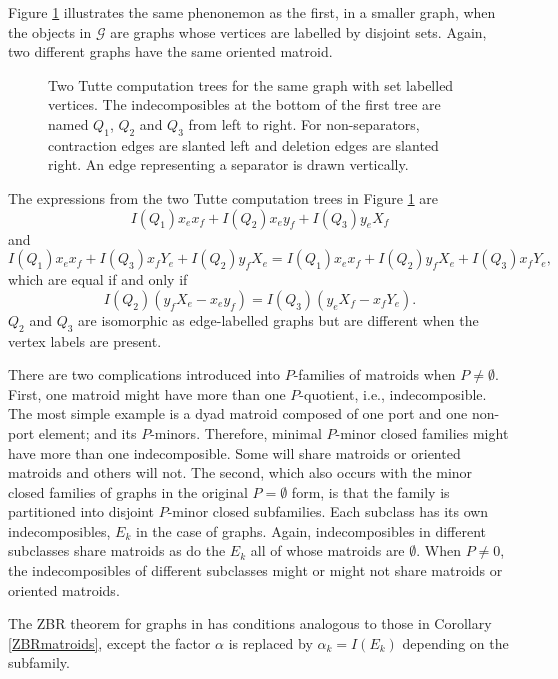 \documentclass[12pt,leqno]{amsart}
\theoremstyle{remark}
\begin{document}
Figure \ref{c4p2TwoFigure} illustrates 
the same phenonemon as the first, in a smaller graph, when
the objects in $\mathcal{G}$ are graphs whose vertices are 
labelled by disjoint sets.  Again, two different graphs have the
same oriented matroid.

\begin{figure}

\caption{\label{c4p2TwoFigure}
Two Tutte computation trees for the same graph with set labelled
vertices.  The indecomposibles at the bottom of the first tree
are named $Q_1$, $Q_2$ and $Q_3$ from left to right.  For non-separators,
contraction 
edges are slanted left and  deletion edges are slanted right.  An edge
representing a separator is drawn vertically.}
\end{figure}

The expressions from the two Tutte computation trees in Figure
\ref{c4p2TwoFigure}
are 
\[
I(Q_1)x_ex_f+I(Q_2)x_ey_f+I(Q_3)y_eX_f
\]
and
\[
I(Q_1)x_ex_f+I(Q_3)x_fY_e+I(Q_2)y_fX_e=
I(Q_1)x_ex_f+I(Q_2)y_fX_e+I(Q_3)x_fY_e,
\]
which are equal if and only if
\begin{equation}
\label{BadZBRExampleEq}
I(Q_2)(y_fX_e - x_ey_f)=
I(Q_3)(y_eX_f - x_fY_e).
\end{equation}
$Q_2$ and $Q_3$ are isomorphic as edge-labelled graphs
but are different when the vertex
labels are present.

There are two  complications introduced
into $P$-families of matroids when $P\neq\emptyset$.
First, one matroid 
might have more than one $P$-quotient, i.e., indecomposible.
The most simple 
example is a dyad matroid composed of one port and one
non-port element; and its $P$-minors.
Therefore, minimal $P$-minor closed families might have 
more than one indecomposible.  Some will share
matroids or oriented matroids and others will not.
The second, which also occurs with the 
minor closed families of graphs \cite{Ellis-Monaghan-Traldi}
in the original $P=\emptyset$ form, is that
the family is partitioned into disjoint $P$-minor closed
subfamilies.  Each subclass has its own indecomposibles,
$E_k$ in the case of graphs.  Again, 
indecomposibles in different subclasses 
share matroids as do
the $E_k$ all of whose matroids are $\emptyset$.
When $P\neq 0$, the indecomposibles of different 
subclasses might or might not share matroids
or oriented matroids.

The ZBR theorem for graphs in \cite{Ellis-Monaghan-Traldi}
has conditions analogous to those in Corollary \ref{ZBRmatroids},
except the factor $\alpha$ is replaced by $\alpha_k=I(E_k)$
depending on the subfamily.  
\end{document}

